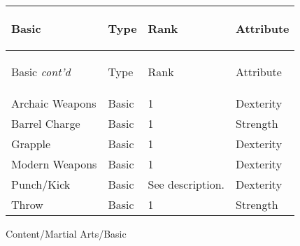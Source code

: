 \documentclass[twoside]{book}
\begin{document}
\begin{longtable}{p{1.25in}lll} 
  Basic
  &
  \begin{turn}{70}{Type}\end{turn}
          
  &
  \begin{turn}{70}{Rank}\end{turn}
          
  &
  \begin{turn}{70}{Attribute}\end{turn}
          
  \\
  \hline
  \hline
  \endfirsthead
  Basic \textit{cont'd}
        
  &
  \begin{turn}{70}{Type}\end{turn}
          
  &
  \begin{turn}{70}{Rank}\end{turn}
          
  &
  \begin{turn}{70}{Attribute}\end{turn}
          
  \\
  \endhead
      
  \raggedright
           Archaic Weapons 
  &
   Basic 
  &
   1 
  &
   Dexterity 
  \tabularnewline
  \hline
      
  \raggedright
           Barrel Charge 
  &
   Basic 
  &
   1 
  &
   Strength 
  \tabularnewline
  \hline
      
  \raggedright
           Grapple 
  &
   Basic 
  &
   1 
  &
   Dexterity 
  \tabularnewline
  \hline
      
  \raggedright
           Modern Weapons 
  &
   Basic 
  &
   1 
  &
   Dexterity 
  \tabularnewline
  \hline
      
  \raggedright
           Punch/Kick 
  &
   Basic 
  &
   See description. 
  &
   Dexterity 
  \tabularnewline
  \hline
      
  \raggedright
           Throw 
  &
   Basic 
  &
   1 
  &
   Strength 
  \tabularnewline
  \hline
      
\end{longtable}
    Content/Martial Arts/Basic
\hspace{-2ex}
\end{document}
